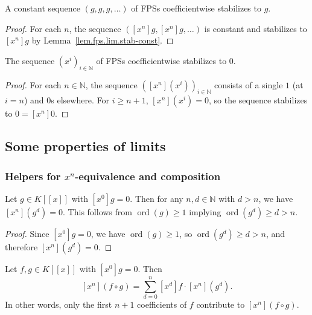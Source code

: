 \begin{lemma}
\label{lem.fps.lim.coeff-stab-const}
\leanhelper
\leanok
A constant sequence $(g, g, g, \ldots)$ of FPSs coefficientwise stabilizes to $g$.
\end{lemma}

\begin{proof}
\leanok
For each $n$, the sequence $([x^n]g, [x^n]g, \ldots)$ is constant and stabilizes
to $[x^n]g$ by Lemma~\ref{lem.fps.lim.stab-const}.
\end{proof}

\begin{lemma}
\label{lem.fps.lim.X-pow}
\leanhelper
\leanok
The sequence $(x^i)_{i \in \mathbb{N}}$ of FPSs coefficientwise stabilizes to $0$.
\end{lemma}

\begin{proof}
\leanok
For each $n \in \mathbb{N}$, the sequence $([x^n](x^i))_{i \in \mathbb{N}}$
consists of a single $1$ (at $i = n$) and $0$s elsewhere. For $i \geq n+1$,
$[x^n](x^i) = 0$, so the sequence stabilizes to $0 = [x^n]0$.
\end{proof}

\subsection{Some properties of limits}

\subsubsection{Helpers for $x^n$-equivalence and composition}

\begin{lemma}
\label{lem.fps.lim.coeff-pow-zero}
\leanhelper
\leanok
Let $g \in K[[x]]$ with $[x^0]g = 0$. Then for any $n, d \in \mathbb{N}$ with $d > n$,
we have $[x^n](g^d) = 0$. This follows from $\operatorname{ord}(g) \geq 1$ implying
$\operatorname{ord}(g^d) \geq d > n$.
\end{lemma}

\begin{proof}
\leanok
Since $[x^0]g = 0$, we have $\operatorname{ord}(g) \geq 1$, so
$\operatorname{ord}(g^d) \geq d > n$, and therefore $[x^n](g^d) = 0$.
\end{proof}

\begin{lemma}
\label{lem.fps.lim.coeff-subst-finite}
\leanhelper
\leanok
Let $f, g \in K[[x]]$ with $[x^0]g = 0$. Then
\[
[x^n](f \circ g) = \sum_{d=0}^{n} [x^d]f \cdot [x^n](g^d).
\]
In other words, only the first $n+1$ coefficients of $f$ contribute to $[x^n](f \circ g)$.
\end{lemma}

